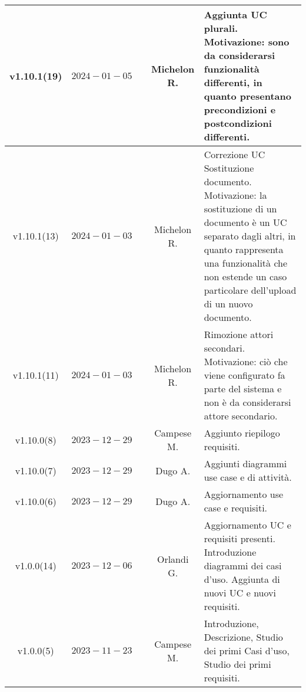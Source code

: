 {\begin{xltabular}{\textwidth}{c|c|c|c|X}
\hline
v1.10.1(19) & $2024-01-05$ &  & Michelon R. & Aggiunta UC plurali. Motivazione: sono da considerarsi funzionalità differenti, in quanto presentano precondizioni e postcondizioni differenti.\\
\hline
v1.10.1(13) & $2024-01-03$ &  & Michelon R. & Correzione UC Sostituzione documento. Motivazione: la sostituzione di un documento è un UC separato dagli altri, in quanto rappresenta una funzionalità che non estende un caso particolare dell'upload di un nuovo documento.\\
\hline
v1.10.1(11) & $2024-01-03$ &  & Michelon R. & Rimozione attori secondari. Motivazione: ciò che viene configurato fa parte del sistema e non è da considerarsi attore secondario.\\
\hline
v1.10.0(8) & $2023-12-29$ &  & Campese M. & Aggiunto riepilogo requisiti.\\
\hline
v1.10.0(7) & $2023-12-29$ &  & Dugo A. & Aggiunti diagrammi use case e di attività.\\
\hline
v1.10.0(6) & $2023-12-29$ &  & Dugo A. & Aggiornamento use case e requisiti.\\
\hline
v1.0.0(14) & $2023-12-06$ &  & Orlandi G. & Aggiornamento UC e requisiti presenti. Introduzione diagrammi dei casi d'uso. Aggiunta di nuovi UC e nuovi requisiti.\\
\hline
v1.0.0(5) & $2023-11-23$ &  & Campese M. & Introduzione, Descrizione, Studio dei primi Casi d'uso, Studio dei primi requisiti.\\

    
\end{xltabular}}
